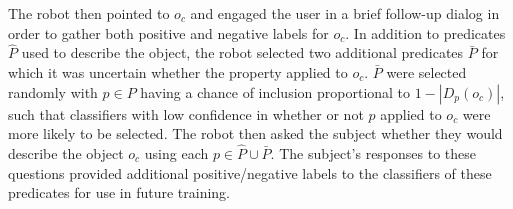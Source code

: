 The robot then pointed to $o_c$ and engaged the user in a brief follow-up dialog in order to gather both positive and negative labels for $o_c$.
In addition to predicates $\hat{P}$ used to describe the object, the robot selected two additional predicates $\bar{P}$ for which it was uncertain whether the property applied to $o_c$.
$\bar{P}$ were selected randomly with $p\in P$ having a chance of inclusion proportional to $1-|D_p(o_c)|$, such that classifiers with low confidence in whether or not $p$ applied to $o_c$ were more likely to be selected.
The robot then asked the subject whether they would describe the object $o_c$ using each $p\in\hat{P}\cup\bar{P}$.
The subject's responses to these questions provided additional positive/negative labels to the classifiers of these predicates for use in future training.
